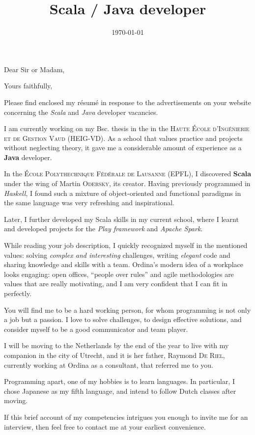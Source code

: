 \documentclass[10pt,a4paper,roman]{moderncv}
\title{Scala / Java developer}
\begin{document}
\date{\today}
\opening{Dear Sir or Madam,}
\closing{Yours faithfully,}

\makelettertitle

Please find enclosed my résumé in response to the advertisements on your website concerning the \textit{Scala} and \textit{Java} developer vacancies.

I am currently working on my Bsc. thesis in the in the \textsc{Haute École d'Ingénierie et de Gestion Vaud} (HEIG-VD). As a school that values practice and projects without neglecting theory, it gave me a considerable amount of experience as a \textbf{Java} developer.

In the \textsc{École Polythechnique Fédérale de Lausanne} (EPFL), I discovered \textbf{Scala} under the wing of Martin \textsc{Odersky}, its creator. Having previously programmed in \textit{Haskell}, I found such a mixture of object-oriented and functional paradigms in the same language was very refreshing and inspirational.

Later, I further developed my Scala skills in my current school, where I learnt and developed projects for the \textit{Play framework} and \textit{Apache Spark}.

While reading your job description, I quickly recognized myself in the mentioned values: solving \textit{complex and interesting} challenges, writing \textit{elegant} code and sharing knowledge and skills with a team. Ordina's modern idea of a workplace looks engaging: open offices, ``people over rules'' and agile methodologies are values that are really motivating, and I am very confident that I can fit in perfectly.

You will find me to be a hard working person, for whom programming is not only a job but a passion. I love to solve challenges, to design effective solutions, and consider myself to be a good communicator and team player.

I will be moving to the Netherlands by the end of the year to live with my companion in the city of Utrecht, and it is her father, Raymond \textsc{De Riel}, currently working at Ordina as a consultant, that referred me to you.

Programming apart, one of my hobbies is to learn languages. In particular, I chose Japanese as my fifth language, and intend to follow Dutch classes after moving.

If this brief account of my competencies intrigues you enough to invite me for an interview, then feel free to contact me at your earliest convenience. 

\makeletterclosing
\end{document}
